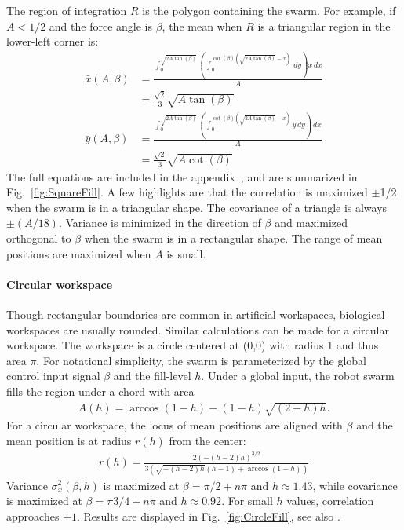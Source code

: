 The region of integration $R$ is the polygon containing the swarm. For example, if $A<1/2$ and the force angle is $\beta$, the mean when $R$ is a triangular region in the lower-left corner is:
\begin{align}\label{eq:meanInSquareWorkspaceLL}
\bar{x}(A,\beta) &= \frac{\int_0^{\sqrt{2 A \tan (\beta)}} \left(\int_0^{\cot (\beta) \left(\sqrt{2 A \tan (\beta)}-x\right)} \, dy\right) x \, dx}{A} \nonumber \\
	&=\frac{ \sqrt{2}}{3} \sqrt{A \tan (\beta )}\\
\bar{y}(A,\beta) &= \frac{\int_0^{\sqrt{2 A \tan (\beta)}} \left(\int_0^{\cot (\beta) \left(\sqrt{2 A \tan (\beta)}-x\right)} y \, dy\right) \, dx}{A} \nonumber\\
	&=\frac{\sqrt{2}}{3}  \sqrt{A \cot (\beta )}
\end{align}
The full equations are included in the appendix~\citep{2016arXiv160901830S}, and are summarized in Fig.~\ref{fig:SquareFill}. A few highlights are that the correlation is maximized $\pm$1/2 when the swarm is in a triangular shape. The covariance of a triangle is always $\pm(A/18)$. Variance is minimized in the direction of $\beta$ and maximized orthogonal to $\beta$ when the swarm is in a rectangular shape. The range of mean positions are maximized when $A$ is small.

\paragraph{Circular workspace}
Though rectangular boundaries are common in artificial workspaces, biological workspaces are usually rounded.
Similar calculations can be made for a circular workspace.  The workspace is a circle centered at (0,0) with radius 1 and thus area $\pi$.
For notational simplicity, the swarm is parameterized by the global control input signal $\beta$ and the fill-level $h$.  
Under a global input, the robot swarm fills the region under a chord with area
\begin{align}
A(h) = \arccos(1-h)-(1-h) \sqrt{(2-h) h}.
\end{align}
For a circular workspace, the locus of mean positions are aligned with $\beta$ and the mean position is at radius $r(h)$ from the center:
\begin{align}
r(h) = \frac{2 (-(h-2) h)^{3/2}}{3 \left(\sqrt{-(h-2) h} (h-1)+\arccos(1-h)\right)}
\end{align}
Variance $\sigma^2_x(\beta,h)$ is maximized at $\beta = \pi/2+n \pi$ and $h\approx1.43$, while covariance is maximized at $\beta = \pi3/4+n \pi$ and $h\approx0.92.$ For small $h$ values, correlation approaches $\pm1$. Results are displayed in Fig.~\ref{fig:CircleFill}, see also \citep{Zhao2016mathematica}.

